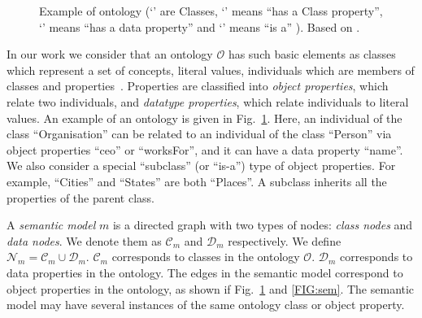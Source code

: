 \documentclass[letterpaper]{article} %
\begin{document}
\begin{figure}[ht]
\caption{Example of ontology
(`' are Classes, `' means ``has a Class property'', 
`' 
means ``has 
a data 
property'' and 
`' means ``is a'' ). Based on 
\cite{Taheriyan2013}.
}
\label{FIG:onto}
\end{figure}

In our work we consider that an ontology $\mathcal{O}$ has such basic elements as classes which represent a set of concepts, literal values, individuals which are members of classes and properties~\cite{Spanos:semweb}.
Properties are classified into \emph{object properties}, which relate two 
individuals, 
and \emph{datatype properties}, which relate individuals to literal values.
An example of an ontology is given in Fig.~\ref{FIG:onto}. 
Here, an individual of the class ``Organisation'' can be related to an individual of the class ``Person'' via object properties ``ceo'' or ``worksFor'', and it can have a data property ``name''. 
We also consider a special ``subclass'' (or ``is-a'') type of object properties.
For 
example, ``Cities'' and ``States'' are both ``Places''. 
A subclass inherits all the properties of the parent class.

A \emph{semantic model} $m$ is a directed graph with two types of nodes: 
\emph{class nodes} and \emph{data nodes}. 
We denote them as $\mathcal{C}_m$ and $\mathcal{D}_m$ respectively.
 We define $\mathcal{N}_m = \mathcal{C}_m \cup 
\mathcal{D}_m$. $ \mathcal{C}_m$ corresponds to classes in the ontology 
$\mathcal{O}$. $\mathcal{D}_m$ corresponds to data 
properties in the ontology. 
The edges in the semantic model correspond to object properties in the ontology, as shown if Fig.~\ref{FIG:onto} and \ref{FIG:sem}.
The semantic model may have several instances of the same ontology class or object property.
\end{document}
